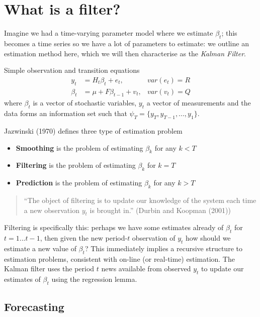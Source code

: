 \documentclass[
  letterpaper,
]{book}
\providecommand{\tightlist}{%
  \setlength{\itemsep}{0pt}\setlength{\parskip}{0pt}}\usepackage{longtable,booktabs,array}
\begin{document}
\hypertarget{what-is-a-filter}{%
\section{What is a filter?}\label{what-is-a-filter}}

Imagine we had a time-varying parameter model where we estimate
\(\beta_t\); this becomes a time series so we have a lot of parameters
to estimate: we outline an estimation method here, which we will then
characterise as the \emph{Kalman Filter}.

Simple observation and transition equations \begin{align}
y_t     &= H_t\beta_t + e_t, &var(e_t) = R \\
\beta_t &= \mu + F \beta_{t-1} + v_t, &var(v_t)=Q
\end{align} where \(\beta_t\) is a vector of stochastic variables,
\(y_t\) a vector of measurements and the data forms an information set
such that \(\psi_T = \{y_T,y_{T-1},...,y_1\}\).

Jazwinski (1970) defines three type of estimation problem

\begin{itemize}
\tightlist
\item
  \textbf{Smoothing} is the problem of estimating \(\beta_k\) for any
  \(k<T\)
\item
  \textbf{Filtering} is the problem of estimating \(\beta_k\) for
  \(k=T\)
\item
  \textbf{Prediction} is the problem of estimating \(\beta_k\) for any
  \(k>T\)
\end{itemize}

\begin{quote}
``The object of filtering is to update our knowledge of the system each
time a new observation \(y_t\) is brought in.'' (Durbin and Koopman
(2001))
\end{quote}

Filtering is specifically this: perhaps we have some estimates already
of \(\beta_t\) for \(t=1...t-1\), then given the new period-\(t\)
observation of \(y_t\) how should we estimate a new value of
\(\beta_t\)? This immediately implies a recursive structure to
estimation problems, consistent with on-line (or real-time) estimation.
The Kalman filter uses the period \(t\) news available from observed
\(y_t\) to update our estimates of \(\beta_t\) using the regression
lemma.

\hypertarget{forecasting}{%
\subsection{Forecasting}\label{forecasting}}
\end{document}
